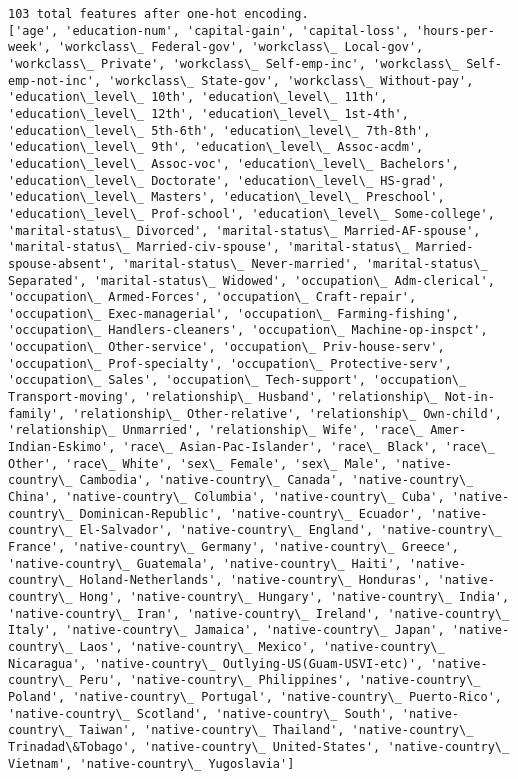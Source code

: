 \documentclass[11pt]{article}
\begin{document}
    \begin{Verbatim}[commandchars=\\\{\}]
103 total features after one-hot encoding.
['age', 'education-num', 'capital-gain', 'capital-loss', 'hours-per-week', 'workclass\_ Federal-gov', 'workclass\_ Local-gov', 'workclass\_ Private', 'workclass\_ Self-emp-inc', 'workclass\_ Self-emp-not-inc', 'workclass\_ State-gov', 'workclass\_ Without-pay', 'education\_level\_ 10th', 'education\_level\_ 11th', 'education\_level\_ 12th', 'education\_level\_ 1st-4th', 'education\_level\_ 5th-6th', 'education\_level\_ 7th-8th', 'education\_level\_ 9th', 'education\_level\_ Assoc-acdm', 'education\_level\_ Assoc-voc', 'education\_level\_ Bachelors', 'education\_level\_ Doctorate', 'education\_level\_ HS-grad', 'education\_level\_ Masters', 'education\_level\_ Preschool', 'education\_level\_ Prof-school', 'education\_level\_ Some-college', 'marital-status\_ Divorced', 'marital-status\_ Married-AF-spouse', 'marital-status\_ Married-civ-spouse', 'marital-status\_ Married-spouse-absent', 'marital-status\_ Never-married', 'marital-status\_ Separated', 'marital-status\_ Widowed', 'occupation\_ Adm-clerical', 'occupation\_ Armed-Forces', 'occupation\_ Craft-repair', 'occupation\_ Exec-managerial', 'occupation\_ Farming-fishing', 'occupation\_ Handlers-cleaners', 'occupation\_ Machine-op-inspct', 'occupation\_ Other-service', 'occupation\_ Priv-house-serv', 'occupation\_ Prof-specialty', 'occupation\_ Protective-serv', 'occupation\_ Sales', 'occupation\_ Tech-support', 'occupation\_ Transport-moving', 'relationship\_ Husband', 'relationship\_ Not-in-family', 'relationship\_ Other-relative', 'relationship\_ Own-child', 'relationship\_ Unmarried', 'relationship\_ Wife', 'race\_ Amer-Indian-Eskimo', 'race\_ Asian-Pac-Islander', 'race\_ Black', 'race\_ Other', 'race\_ White', 'sex\_ Female', 'sex\_ Male', 'native-country\_ Cambodia', 'native-country\_ Canada', 'native-country\_ China', 'native-country\_ Columbia', 'native-country\_ Cuba', 'native-country\_ Dominican-Republic', 'native-country\_ Ecuador', 'native-country\_ El-Salvador', 'native-country\_ England', 'native-country\_ France', 'native-country\_ Germany', 'native-country\_ Greece', 'native-country\_ Guatemala', 'native-country\_ Haiti', 'native-country\_ Holand-Netherlands', 'native-country\_ Honduras', 'native-country\_ Hong', 'native-country\_ Hungary', 'native-country\_ India', 'native-country\_ Iran', 'native-country\_ Ireland', 'native-country\_ Italy', 'native-country\_ Jamaica', 'native-country\_ Japan', 'native-country\_ Laos', 'native-country\_ Mexico', 'native-country\_ Nicaragua', 'native-country\_ Outlying-US(Guam-USVI-etc)', 'native-country\_ Peru', 'native-country\_ Philippines', 'native-country\_ Poland', 'native-country\_ Portugal', 'native-country\_ Puerto-Rico', 'native-country\_ Scotland', 'native-country\_ South', 'native-country\_ Taiwan', 'native-country\_ Thailand', 'native-country\_ Trinadad\&Tobago', 'native-country\_ United-States', 'native-country\_ Vietnam', 'native-country\_ Yugoslavia']

    \end{Verbatim}
\end{document}
